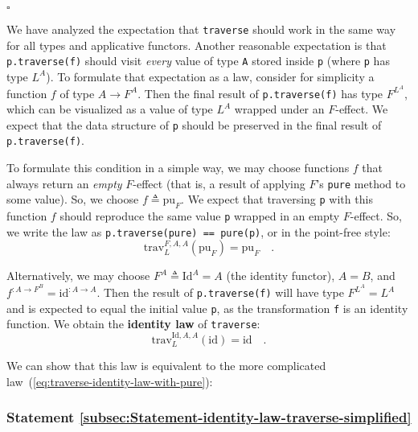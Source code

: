 $\square$

We have analyzed the expectation that \lstinline!traverse! should
work in the same way for all types and applicative functors. Another
reasonable expectation is that \lstinline!p.traverse(f)! should visit
\emph{every} value of type \lstinline!A! stored inside \lstinline!p!
(where \lstinline!p! has type $L^{A}$). To formulate that expectation
as a law, consider for simplicity a function $f$ of type $A\rightarrow F^{A}$.
Then the final result of \lstinline!p.traverse(f)! has type $F^{L^{A}}$,
which can be visualized as a value of type $L^{A}$ wrapped under
an $F$-effect. We expect that the data structure of \lstinline!p!
should be preserved in the final result of \lstinline!p.traverse(f)!. 

To formulate this condition in a simple way, we may choose functions
$f$ that always return an \emph{empty} $F$-effect (that is, a result
of applying $F$\textsf{'}s \lstinline!pure! method to some value). So, we
choose $f\triangleq\text{pu}_{F}$. We expect that traversing \lstinline!p!
with this function $f$ should reproduce the same value \lstinline!p!
wrapped in an empty $F$-effect. So, we write the law as \lstinline!p.traverse(pure) == pure(p)!,
or in the point-free style:
\begin{equation}
\text{trav}_{L}^{F,A,A}(\text{pu}_{F})=\text{pu}_{F}\quad.\label{eq:traverse-identity-law-with-pure}
\end{equation}

Alternatively, we may choose $F^{A}\triangleq\text{Id}^{A}=A$ (the
identity functor), $A=B$, and $f^{:A\rightarrow F^{B}}=\text{id}^{:A\rightarrow A}$.
Then the result of \lstinline!p.traverse(f)! will have type $F^{L^{A}}=L^{A}$
and is expected to equal the initial value \lstinline!p!, as the
transformation \lstinline!f! is an identity function. We obtain the
\textbf{identity law}
of \lstinline!traverse!:
\begin{equation}
\text{trav}_{L}^{\text{Id},A,A}(\text{id})=\text{id}\quad.\label{eq:traverse-identity-law}
\end{equation}

We can show that this law is equivalent to the more complicated law~(\ref{eq:traverse-identity-law-with-pure}):

\subsubsection{Statement \label{subsec:Statement-identity-law-traverse-simplified}\ref{subsec:Statement-identity-law-traverse-simplified}}

